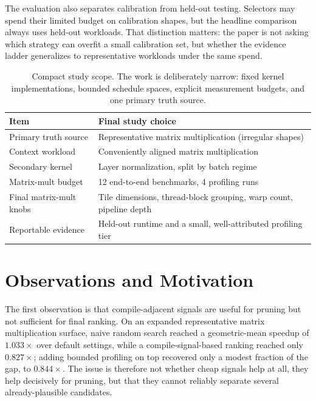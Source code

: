 \documentclass[10pt,twocolumn]{article}
\begin{document}
The evaluation also separates calibration from held-out testing. Selectors may spend their limited budget on calibration shapes, but the headline comparison always uses held-out workloads. That distinction matters: the paper is not asking which strategy can overfit a small calibration set, but whether the evidence ladder generalizes to representative workloads under the same spend.

\begin{table}[t]
\centering
\small
\begin{tabular}{p{}p{}}
\toprule
Item & Final study choice \\
\midrule
Primary truth source & Representative matrix multiplication (irregular shapes) \\
Context workload & Conveniently aligned matrix multiplication \\
Secondary kernel & Layer normalization, split by batch regime \\
Matrix-mult budget & 12 end-to-end benchmarks, 4 profiling runs \\
Final matrix-mult knobs & Tile dimensions, thread-block grouping, warp count, pipeline depth \\
Reportable evidence & Held-out runtime and a small, well-attributed profiling tier \\
\bottomrule
\end{tabular}
\caption{Compact study scope. The work is deliberately narrow: fixed kernel implementations, bounded schedule spaces, explicit measurement budgets, and one primary truth source.}
\label{tab:condensed-scope}
\end{table}

\section{Observations and Motivation}

The first observation is that compile-adjacent signals are useful for pruning but not sufficient for final ranking. On an expanded representative matrix multiplication surface, naive random search reached a geometric-mean speedup of $1.033\times$ over default settings, while a compile-signal-based ranking reached only $0.827\times$; adding bounded profiling on top recovered only a modest fraction of the gap, to $0.844\times$. The issue is therefore not whether cheap signals help at all, they help decisively for pruning, but that they cannot reliably separate several already-plausible candidates.
\end{document}
